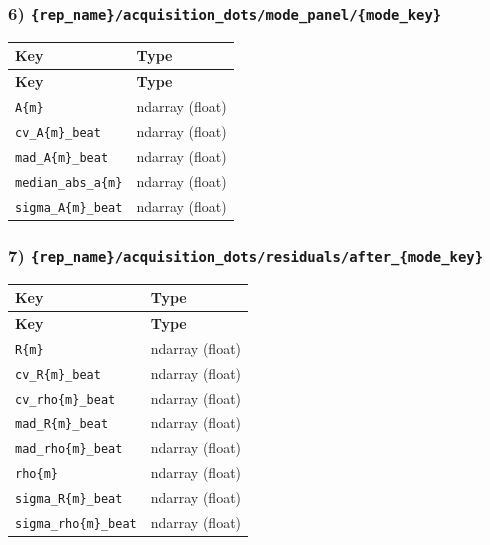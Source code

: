 \documentclass[11pt]{article}
\begin{document}
\subsubsection*{6) \texttt{\{rep\_\allowbreak{}name\}/\allowbreak{}acquisition\_\allowbreak{}dots/\allowbreak{}mode\_\allowbreak{}panel/\allowbreak{}\{mode\_\allowbreak{}key\}}}
\begin{longtable}{|p{}|p{}|}
\hline
\textbf{Key} & \textbf{Type} \\ \hline
\endfirsthead
\hline
\textbf{Key} & \textbf{Type} \\ \hline
\endhead
\texttt{A\{m\}} & ndarray (float) \\ \hline
\texttt{cv\_\allowbreak{}A\{m\}\_\allowbreak{}beat} & ndarray (float) \\ \hline
\texttt{mad\_\allowbreak{}A\{m\}\_\allowbreak{}beat} & ndarray (float) \\ \hline
\texttt{median\_\allowbreak{}abs\_\allowbreak{}a\{m\}} & ndarray (float) \\ \hline
\texttt{sigma\_\allowbreak{}A\{m\}\_\allowbreak{}beat} & ndarray (float) \\ \hline
\end{longtable}

\subsubsection*{7) \texttt{\{rep\_\allowbreak{}name\}/\allowbreak{}acquisition\_\allowbreak{}dots/\allowbreak{}residuals/\allowbreak{}after\_\allowbreak{}\{mode\_\allowbreak{}key\}}}
\begin{longtable}{|p{}|p{}|}
\hline
\textbf{Key} & \textbf{Type} \\ \hline
\endfirsthead
\hline
\textbf{Key} & \textbf{Type} \\ \hline
\endhead
\texttt{R\{m\}} & ndarray (float) \\ \hline
\texttt{cv\_\allowbreak{}R\{m\}\_\allowbreak{}beat} & ndarray (float) \\ \hline
\texttt{cv\_\allowbreak{}rho\{m\}\_\allowbreak{}beat} & ndarray (float) \\ \hline
\texttt{mad\_\allowbreak{}R\{m\}\_\allowbreak{}beat} & ndarray (float) \\ \hline
\texttt{mad\_\allowbreak{}rho\{m\}\_\allowbreak{}beat} & ndarray (float) \\ \hline
\texttt{rho\{m\}} & ndarray (float) \\ \hline
\texttt{sigma\_\allowbreak{}R\{m\}\_\allowbreak{}beat} & ndarray (float) \\ \hline
\texttt{sigma\_\allowbreak{}rho\{m\}\_\allowbreak{}beat} & ndarray (float) \\ \hline
\end{longtable}
\end{document}
